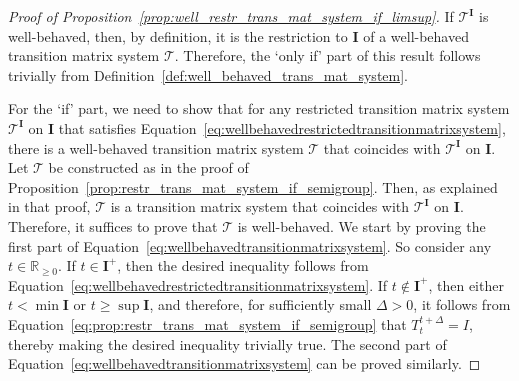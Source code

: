 \documentclass[10pt,a4paper]{paper}
\theoremstyle{definition}
\newcommand{\reals}{\mathbb{R}}
\newcommand{\realsnonneg}{\reals_{\geq 0}}
\newcommand{\norm}[1]{\left\lVert #1 \right\rVert}
\newcommand{\coloneqq}{:\!=}
\begin{document}
\begin{proof}[Proof of Proposition~\ref{prop:well_restr_trans_mat_system_if_limsup}]
If $\mathcal{T}^{\mathbf{I}}$ is well-behaved, then, by definition, it is the restriction to $\mathbf{I}$ of a well-behaved transition matrix system $\mathcal{T}$. Therefore, the `only if' part of this result follows trivially from Definition~\ref{def:well_behaved_trans_mat_system}.

For the `if' part, we need to show that for any restricted transition matrix system $\mathcal{T}^\mathbf{I}$ on $\mathbf{I}$ that satisfies Equation~\eqref{eq:wellbehavedrestrictedtransitionmatrixsystem}, there is a well-behaved transition matrix system $\mathcal{T}$ that coincides with $\mathcal{T}^\mathbf{I}$ on $\mathbf{I}$. Let $\mathcal{T}$ be constructed as in the proof of Proposition~\ref{prop:restr_trans_mat_system_if_semigroup}. Then, as explained in that proof, $\mathcal{T}$ is a transition matrix system that coincides with $\mathcal{T}^{\mathbf{I}}$ on $\mathbf{I}$. Therefore, it suffices to prove that $\mathcal{T}$ is well-behaved. We start by proving the first part of Equation~\eqref{eq:wellbehavedtransitionmatrixsystem}. So consider any $t\in\realsnonneg$. If $t\in\mathbf{I}^+$, then the desired inequality follows from Equation~\eqref{eq:wellbehavedrestrictedtransitionmatrixsystem}. If $t\notin\mathbf{I}^+$, then either $t<\min\mathbf{I}$ or $t\geq\sup\mathbf{I}$, and therefore, for sufficiently small $\Delta>0$, it follows from Equation~\eqref{eq:prop:restr_trans_mat_system_if_semigroup} that $T_t^{t+\Delta}=I$, thereby making the desired inequality trivially true. The second part of Equation~\eqref{eq:wellbehavedtransitionmatrixsystem} can be proved similarly.
\end{proof}
\end{document}
